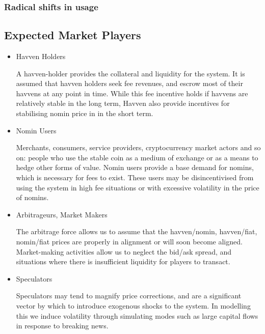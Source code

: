 \subsubsection{Radical shifts in usage}



\subsection{Expected Market Players}

\begin{itemize}
	\item{Havven Holders}

	A havven-holder provides the collateral and liquidity for the system. It is assumed that havven holders seek fee revenues,
	and escrow most of their havvens at any point in time. While this fee incentive holds if havvens are relatively stable in the long term, Havven also provide incentives for stabilising nomin price in in the short term. 

	\item{Nomin Users}

	Merchants, consumers, service providers, cryptocurrency market actors and so on: people who use the stable coin as a
	medium of exchange or as a means to hedge other forms of value. Nomin users provide a base demand for nomins, which is necessary for fees
	to exist. These users may be disincentivised from using the system in high fee situations or with excessive volatility
	in the price of nomins.

	\item{Arbitrageurs, Market Makers}

	The arbitrage force allows us to assume that the havven/nomin, havven/fiat, nomin/fiat
	prices are properly in alignment or will soon become aligned. Market-making activities
	allow us to neglect the bid/ask spread, and situations where there is insufficient
	liquidity for players to transact.
	
	\item{Speculators}
	
	Speculators may tend to magnify price corrections, and are a significant vector by which to introduce
	exogenous shocks to the system. In modelling this we induce volatility through simulating modes such as large capital flows in response to breaking news.
	

\end{itemize}
